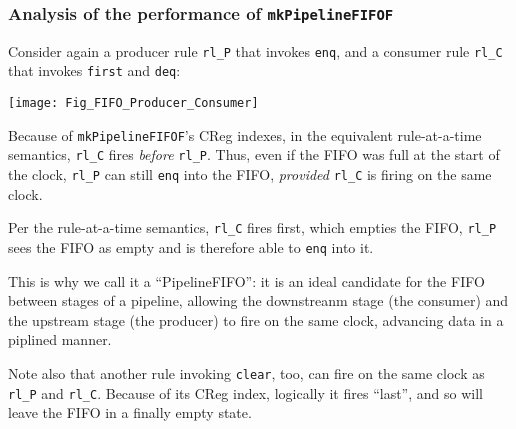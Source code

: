 \begin{frame}[fragile]
\frametitle{Analysis of the performance of {\tt mkPipelineFIFOF}}

\footnotesize

\begin{minipage}{0.45\textwidth}
  Consider again a producer rule \verb|rl_P| that invokes \verb|enq|, and a
  consumer rule \verb|rl_C| that invokes \verb|first| and \verb|deq|:
\end{minipage}
\hm
\begin{minipage}{0.5\textwidth}
  \texttt{[image: Fig\_FIFO\_Producer\_Consumer]}
\end{minipage}

\vspace{5ex}

Because of {\tt mkPipelineFIFOF}'s CReg indexes, in the equivalent
rule-at-a-time semantics, \verb|rl_C| fires \emph{before} \verb|rl_P|.
Thus, even if the FIFO was full at the start of the clock, \verb|rl_P|
can still \verb|enq| into the FIFO, \emph{provided} \verb|rl_C| is
firing on the same clock.

\vspace{1ex}

Per the rule-at-a-time semantics,
\verb|rl_C| fires first, which empties the FIFO, {\ie} \verb|rl_P|
sees the FIFO as empty and is therefore able to \verb|enq| into it.

\vspace{1ex}

This is why we call it a ``PipelineFIFO'': it is an ideal candidate
for the FIFO between stages of a pipeline, allowing the downstreanm
stage (the consumer) and the upstream stage (the producer) to fire on
the same clock, advancing data in a piplined manner.

\vspace{2ex}

Note also that another rule invoking \verb|clear|, too, can fire on
the same clock as \verb|rl_P| and \verb|rl_C|.  Because of its CReg
index, logically it fires ``last'', and so will leave the FIFO in a
finally empty state.

\end{frame}


